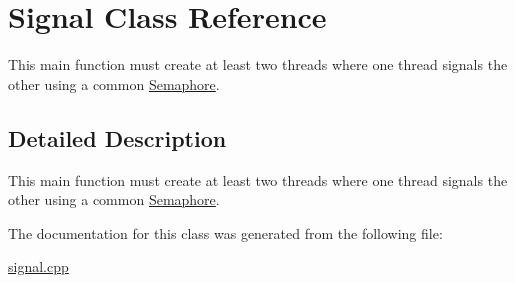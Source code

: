 \hypertarget{class_signal}{}\section{Signal Class Reference}
\label{class_signal}


This main function must create at least two threads where one thread signals the other using a common \mbox{\hyperlink{class_semaphore}{Semaphore}}.  




\subsection{Detailed Description}
This main function must create at least two threads where one thread signals the other using a common \mbox{\hyperlink{class_semaphore}{Semaphore}}. 

The documentation for this class was generated from the following file\+:\begin{DoxyCompactItemize}
\item 
\mbox{\hyperlink{signal_8cpp}{signal.\+cpp}}\end{DoxyCompactItemize}
